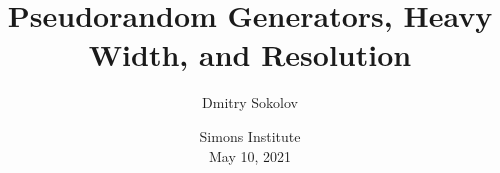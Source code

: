 

\titlegraphic{
    
}


\title[]{
    Pseudorandom Generators, Heavy Width, and Resolution
}

\author{
    Dmitry Sokolov
}  


\date{Simons Institute\\ May 10, 2021}

\newcommand{\SPCR}{\PrSys{S}\text{-}\PrSys{PCR}}
\newcommand{\SSOS}{\PrSys{S}\text{-}\PrSys{SOS}}




    \maketitle

    
    
    
    

